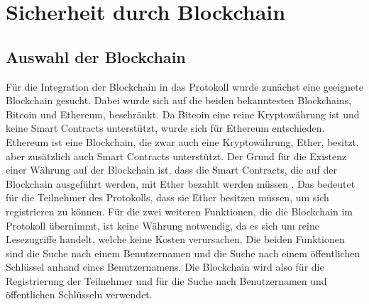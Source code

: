 \section{Sicherheit durch Blockchain}
\label{sec:blockchainintegration}



\subsection{Auswahl der Blockchain}
Für die Integration der Blockchain in das Protokoll wurde zunächst eine geeignete Blockchain gesucht. Dabei wurde sich auf die beiden bekanntesten Blockchains, Bitcoin und Ethereum, beschränkt. Da Bitcoin eine reine Kryptowährung ist und keine Smart Contracts unterstützt, wurde sich für Ethereum entschieden. Ethereum ist eine Blockchain, die zwar auch eine Kryptowährung, Ether, besitzt, aber zusätzlich auch Smart Contracts unterstützt. Der Grund für die Existenz einer Währung auf der Blockchain ist, dass die Smart Contracts, die auf der Blockchain ausgeführt werden, mit Ether bezahlt werden müssen \parencite[S. 2]{Antonopoulos_MasteringEthereum}. Das bedeutet für die Teilnehmer des Protokolls, dass sie Ether besitzen müssen, um sich registrieren zu können. Für die zwei weiteren Funktionen, die die Blockchain im Protokoll übernimmt, ist keine Währung notwendig, da es sich um reine Lesezugriffe handelt, welche keine Kosten verursachen. Die beiden Funktionen sind die Suche nach einem Benutzernamen und die Suche nach einem öffentlichen Schlüssel anhand eines Benutzernamens. Die Blockchain wird also für die Registrierung der Teilnehmer und für die Suche nach Benutzernamen und öffentlichen Schlüsseln verwendet.


